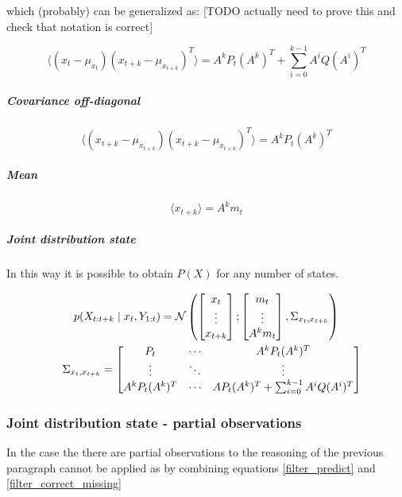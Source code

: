\documentclass{article}
\newcommand{\E}[1]{\langle #1 \rangle} %
\newcommand{\norm}[3]{\mathcal{N}\left(#1; #2, #3\right)} %
\let\Oldsubsubsection\subsubsection
\renewcommand{\subsubsection}{\FloatBarrier\Oldsubsubsection}
\begin{document}
which (probably) can be generalized as: [TODO actually need to prove this and check that notation is correct]

\begin{equation}
    \E{(x_t -\mu_{x_t})(x_{t+k} - \mu_{x_{t+k}})^T} = A^kP_t(A^k)^T + \sum_{i=0}^{k-1} A^iQ(A^i)^T
\end{equation}

\subparagraph{Covariance off-diagonal}

\begin{equation}
    \E{(x_{t+k} - \mu_{x_{t+k}})(x_{t+k} - \mu_{x_{t+k}})^T} = A^kP_t(A^k)^T
\end{equation}

\subparagraph{Mean}

\begin{equation}
    \E{x_{t+k}} = A^km_t
\end{equation}

\subparagraph{Joint distribution state}
In this way it is possible to obtain $P(X)$ for any number of states.

\begin{multline}\label{p_X_final}
p(X_{t:t+k}\mid x_t, Y_{1:t}) =\norm{\begin{bmatrix}x_t\\\vdots\\x_{t+k}\end{bmatrix}}{\begin{bmatrix}m_t\\\vdots\\A^km_t\end{bmatrix}}{\Sigma_{x_t, x_{t+k}}}\\
\shoveleft\Sigma_{x_t, x_{t+k}} = {\begin{bmatrix}P_t & \cdots & A^kP_t(A^k)^T\\ \vdots & \ddots & \vdots \\A^kP_t(A^k)^T & \cdots & AP_t(A^k)^T + \sum_{i=0}^{k-1} A^iQ(A^i)^T\end{bmatrix}}
\end{multline}



\subsubsection{Joint distribution state - partial observations}

In the case the there are partial observations to the reasoning of the previous paragraph cannot be applied as by combining equations \ref{filter_predict} and \ref{filter_correct_missing}
\end{document}
